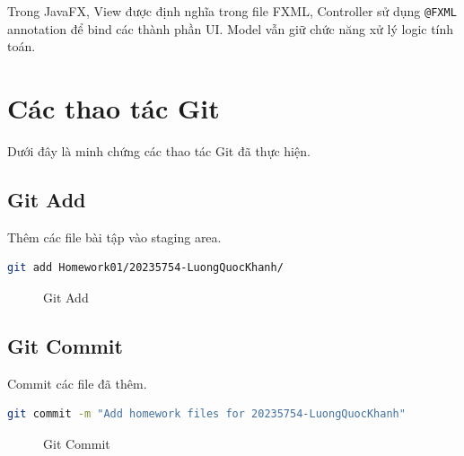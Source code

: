 \documentclass[12pt,a4paper]{article}
\begin{document}
Trong JavaFX, View được định nghĩa trong file FXML, Controller sử dụng \texttt{@FXML} annotation để bind các thành phần UI. Model vẫn giữ chức năng xử lý logic tính toán.

\section{Các thao tác Git}

Dưới đây là minh chứng các thao tác Git đã thực hiện.

\subsection{Git Add}
Thêm các file bài tập vào staging area.

\begin{lstlisting}[language=bash]
git add Homework01/20235754-LuongQuocKhanh/
\end{lstlisting}

\begin{figure}[H]
    \centering
    \caption{Git Add}
\end{figure}

\subsection{Git Commit}
Commit các file đã thêm.

\begin{lstlisting}[language=bash]
git commit -m "Add homework files for 20235754-LuongQuocKhanh"
\end{lstlisting}

\begin{figure}[H]
    \centering
    \caption{Git Commit}
\end{figure}

\end{document}
